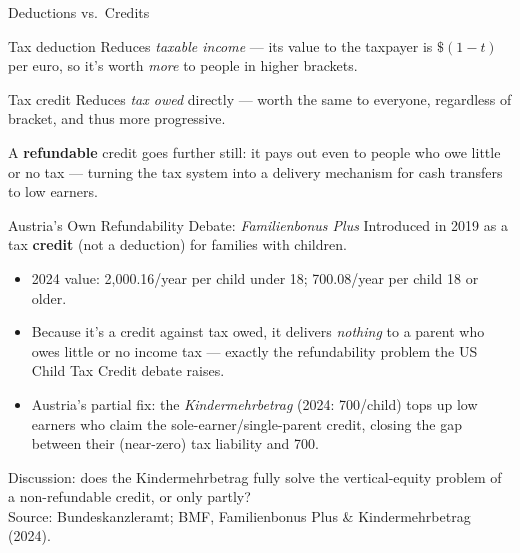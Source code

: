 \documentclass[11pt,aspectratio=169]{beamer}
\newcommand{\srcnote}[1]{{\footnotesize\color{wugray}Source: #1}}
\begin{document}
\begin{frame}{Deductions vs.\ Credits}
  \begin{block}{Tax deduction}
    Reduces \emph{taxable income} --- its value to the taxpayer is \(\$(1-t)\) per euro, so it's worth \emph{more} to people in higher brackets.
  \end{block}
  \begin{block}{Tax credit}
    Reduces \emph{tax owed} directly --- worth the same to everyone, regardless of bracket, and thus more progressive.
  \end{block}
  \vspace{0.3em}

  A \textbf{refundable} credit goes further still: it pays out even to people who owe little or no tax --- turning the tax system into a delivery mechanism for cash transfers to low earners.
\end{frame}

\begin{frame}{Austria's Own Refundability Debate: \emph{Familienbonus Plus}}
  \footnotesize
  Introduced in 2019 as a tax \textbf{credit} (not a deduction) for families with children.
  \begin{itemize}
    \item 2024 value: \texteuro{}2{,}000.16/year per child under 18; \texteuro{}700.08/year per child 18 or older.
    \item Because it's a credit against tax owed, it delivers \emph{nothing} to a parent who owes little or no income tax --- exactly the refundability problem the US Child Tax Credit debate raises.
    \item Austria's partial fix: the \emph{Kindermehrbetrag} (2024: \texteuro{}700/child) tops up low earners who claim the sole-earner/single-parent credit, closing the gap between their (near-zero) tax liability and \texteuro{}700.
  \end{itemize}
  \vspace{0.3em}
  \centering
  \alert{Discussion:} does the Kindermehrbetrag fully solve the vertical-equity problem of a non-refundable credit, or only partly?\\
  \srcnote{Bundeskanzleramt; BMF, Familienbonus Plus \& Kindermehrbetrag (2024).}
\end{frame}
\end{document}
